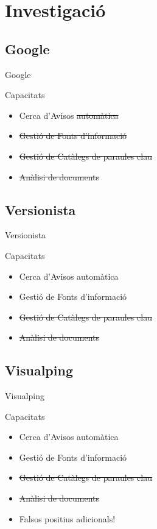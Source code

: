 \documentclass{beamer}
\begin{document}
\section{Investigació}

\subsection{Google}

\begin{frame}{Google}
    \begin{block}{Capacitats}
        \begin{itemize}
            \item Cerca d'Avisos \sout{automàtica}
            \item \sout{Gestió de Fonts d'informació}
            \item \sout{Gestió de Catàlegs de paraules clau}
            \item \sout{Anàlisi de documents}
        \end{itemize}
    \end{block}
\end{frame}

\subsection{Versionista}

\begin{frame}{Versionista}
    \begin{block}{Capacitats}
        \begin{itemize}
            \item Cerca d'Avisos automàtica
            \item Gestió de Fonts d'informació
            \item \sout{Gestió de Catàlegs de paraules clau}
            \item \sout{Anàlisi de documents}
        \end{itemize}
    \end{block}
\end{frame}


\subsection{Visualping}

\begin{frame}{Visualping}
    \begin{block}{Capacitats}
        \begin{itemize}
            \item Cerca d'Avisos automàtica
            \item Gestió de Fonts d'informació
            \item \sout{Gestió de Catàlegs de paraules clau}
            \item \sout{Anàlisi de documents}
            \item Falsos positius adicionals!
        \end{itemize}
    \end{block}
\end{frame}
\end{document}
